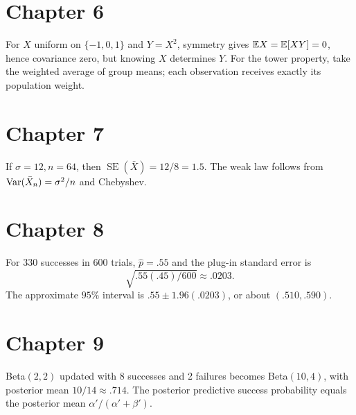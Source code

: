 \section*{Chapter 6}
For $X$ uniform on $\{-1,0,1\}$ and $Y=X^2$, symmetry gives $\mathbb E X=\mathbb E[XY]=0$, hence covariance zero, but knowing $X$ determines $Y$. For the tower property, take the weighted average of group means; each observation receives exactly its population weight.

\section*{Chapter 7}
If $\sigma=12,n=64$, then $\operatorname{SE}(\bar X)=12/8=1.5$. The weak law follows from $\operatorname{Var}(\bar X_n)=\sigma^2/n$ and Chebyshev.

\section*{Chapter 8}
For 330 successes in 600 trials, $\hat p=.55$ and the plug-in standard error is
\[
\sqrt{.55(.45)/600}\approx .0203.
\]
The approximate $95\%$ interval is $.55\pm1.96(.0203)$, or about $(.510,.590)$.

\section*{Chapter 9}
Beta$(2,2)$ updated with 8 successes and 2 failures becomes Beta$(10,4)$, with posterior mean $10/14\approx.714$. The posterior predictive success probability equals the posterior mean $\alpha'/ (\alpha'+\beta')$.

\clearpage
